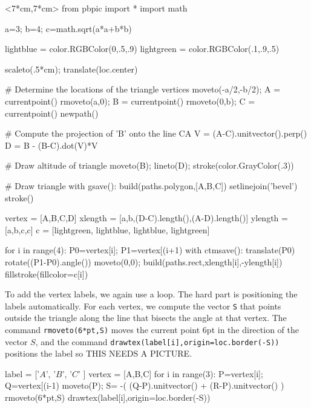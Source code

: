 \documentclass[12pt]{article}
\def\code#1{{\tt #1}}
\begin{document}
\hfil\begin{pbpic}<7*cm,7*cm>
from pbpic import *
import math

a=3; b=4; c=math.sqrt(a*a+b*b)

lightblue = color.RGBColor(0,.5,.9)
lightgreen = color.RGBColor(.1,.9,.5)

scaleto(.5*cm); translate(loc.center)

# Determine the locations of the triangle vertices
moveto(-a/2,-b/2); A = currentpoint()
rmoveto(a,0); B = currentpoint()
rmoveto(0,b); C = currentpoint()
newpath()

# Compute the projection of 'B' onto the line CA
V = (A-C).unitvector().perp()
D = B - (B-C).dot(V)*V

# Draw altitude of triangle
moveto(B); lineto(D);
stroke(color.GrayColor(.3))

# Draw triangle
with gsave():
  build(paths.polygon,[A,B,C])
  setlinejoin('bevel')
  stroke()

vertex = [A,B,C,D]
xlength = [a,b,(D-C).length(),(A-D).length()]
ylength = [a,b,c,c]
c = [lightgreen, lightblue, lightblue, lightgreen]

for i in range(4):
  P0=vertex[i]; P1=vertex[(i+1)%
  with ctmsave():
    translate(P0)
    rotate((P1-P0).angle())
    moveto(0,0);
    build(paths.rect,xlength[i],-ylength[i])
  fillstroke(fillcolor=c[i])
\end{pbpic}

To add the vertex labels, we again use a loop.  The
hard part is positioning the labels automatically.
For each vertex, we compute the vector \code{S} that
points outside the triangle along the line that bisects
the angle at that vertex.  The command \code{rmoveto(6*pt,S)}
moves the current point 6pt in the direction of the vector $S$,
and the command \code{drawtex(label[i],origin=loc.border(-S))}
positions the label so THIS NEEDS A PICTURE.
\begin{snippet}
label = ['$A$', '$B$', '$C$' ]
vertex = [A,B,C]
for i in range(3):
  P=vertex[i]; Q=vertex[(i-1)%
  moveto(P);
  S= -( (Q-P).unitvector() + (R-P).unitvector() )
  rmoveto(6*pt,S)
  drawtex(label[i],origin=loc.border(-S))
\end{snippet}
\end{document}
